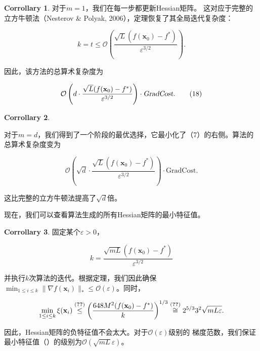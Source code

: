 \documentclass[a4paper,twoside,AutoFakeBold]{article}
\theoremstyle{definition}
\newtheorem{corr2}{{Corrollary}}[section]
\begin{document}
\begin{corr2}\label{corr:3.5}
对于\(\boxed{ m = 1} \)，我们在每一步都更新Hessian矩阵。
这对应于完整的立方牛顿法（Nesterov \& Polyak, 2006），定理恢复了其全局迭代复杂度：

\[
k = t \leq \mathcal{O}\left( \frac{\sqrt{L}(f(\mathbf{x}_0) - f^*)}{\varepsilon^{3/2}} \right).
\]

因此，该方法的总算术复杂度为

\begin{equation}\label{18}
\mathcal{O}\left( d \cdot \frac{\sqrt{L}(f(\mathbf{x}_0) - f^*)}{\varepsilon^{3/2}} \right) \cdot \textsl{GradCost}. \tag{18}
\end{equation}

\end{corr2}


\begin{corr2}\label{corr:3.6}
	
对于\(\boxed{ m = d}\)，我们得到了一个阶段的最优选择，它最小化了（7）的右侧。算法的总算术复杂度变为

\[
\mathcal{O}\left( \sqrt{d} \cdot \frac{\sqrt{L}(f(\mathbf{x}_0) - f^*)}{\varepsilon^{3/2}} \right) \cdot \text{GradCost}.
\]

这比完整的立方牛顿法提高了\(\sqrt{d}\)倍。

现在，我们可以查看算法生成的所有Hessian矩阵的最小特征值。

\end{corr2}

\begin{corr2}\label{corr:3.7}
固定某个\(\varepsilon > 0\)，

\begin{equation}\label{19}
k = \frac{\sqrt{mL}(f(\mathbf{x}_0) - f^*)}{\varepsilon^{3/2}} \tag{19}
\end{equation}

并执行\(k\)次算法的迭代。根据定理，我们因此确保\(\min_{1 \leq i \leq k} \|\nabla f(\mathbf{x}_i)\|_* \leq \mathcal{O}(\varepsilon)\)。同时，

\[
\min_{1 \leq i \leq k} \xi(\mathbf{x}_i) \stackrel{(\Ref{15})}{\leq} \left( \frac{648M^2(f(\mathbf{x}_0) - f^*)}{k} \right)^{1/3} \stackrel{(\Ref{19})}{\cong} 2^{5/3} 3^2 \sqrt{mL\varepsilon} .
\]

因此，Hessian矩阵的负特征值不会太大。对于\(\mathcal{O}(\varepsilon)\)级别的
梯度范数，我们保证最小特征值（）的级别为\(\mathcal{O}(\sqrt{mL} \varepsilon)\)。

\end{corr2}
\end{document}
